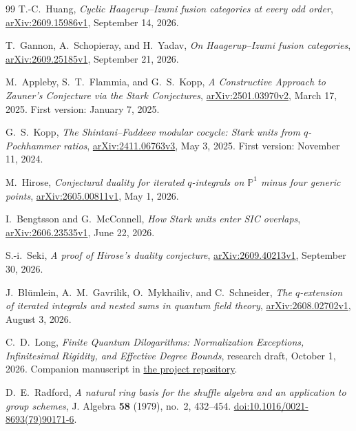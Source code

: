 \documentclass[11pt]{article}
\numberwithin{equation}{section}
\theoremstyle{definition}
\theoremstyle{remark}
\begin{document}
\begin{thebibliography}{99}
T.-C.~Huang,
\emph{Cyclic Haagerup--Izumi fusion categories at every odd order},
\href{https://arxiv.org/abs/2609.15986v1}{arXiv:2609.15986v1}, September 14, 2026.

T.~Gannon, A.~Schopieray, and H.~Yadav,
\emph{On Haagerup--Izumi fusion categories},
\href{https://arxiv.org/abs/2609.25185v1}{arXiv:2609.25185v1}, September 21, 2026.

M.~Appleby, S.~T.~Flammia, and G.~S.~Kopp,
\emph{A Constructive Approach to Zauner's Conjecture via the Stark Conjectures},
\href{https://arxiv.org/abs/2501.03970v2}{arXiv:2501.03970v2}, March 17, 2025.
First version: January 7, 2025.

G.~S.~Kopp,
\emph{The Shintani--Faddeev modular cocycle: Stark units from $q$-Pochhammer ratios},
\href{https://arxiv.org/abs/2411.06763v3}{arXiv:2411.06763v3}, May 3, 2025.
First version: November 11, 2024.

M.~Hirose,
\emph{Conjectural duality for iterated $q$-integrals on $\mathbb P^1$ minus four generic points},
\href{https://arxiv.org/abs/2605.00811v1}{arXiv:2605.00811v1}, May 1, 2026.

I.~Bengtsson and G.~McConnell,
\emph{How Stark units enter SIC overlaps},
\href{https://arxiv.org/abs/2606.23535v1}{arXiv:2606.23535v1}, June 22, 2026.

S.-i.~Seki,
\emph{A proof of Hirose's duality conjecture},
\href{https://arxiv.org/abs/2609.40213v1}{arXiv:2609.40213v1}, September 30, 2026.

J.~Bl\"umlein, A.~M.~Gavrilik, O.~Mykhailiv, and C.~Schneider,
\emph{The $q$-extension of iterated integrals and nested sums in quantum field theory},
\href{https://arxiv.org/abs/2608.02702v1}{arXiv:2608.02702v1}, August 3, 2026.

C.~D.~Long,
\emph{Finite Quantum Dilogarithms: Normalization Exceptions, Infinitesimal
Rigidity, and Effective Degree Bounds}, research draft, October 1, 2026.
Companion manuscript in
\href{https://github.com/long-mathematics/quantum-polylogarithms-finite-dilogarithms}{the project repository}.

D.~E.~Radford,
\emph{A natural ring basis for the shuffle algebra and an application to group
schemes},
J. Algebra \textbf{58} (1979), no.~2, 432--454.
\href{https://doi.org/10.1016/0021-8693(79)90171-6}{doi:10.1016/0021-8693(79)90171-6}.

\end{thebibliography}
\end{document}
